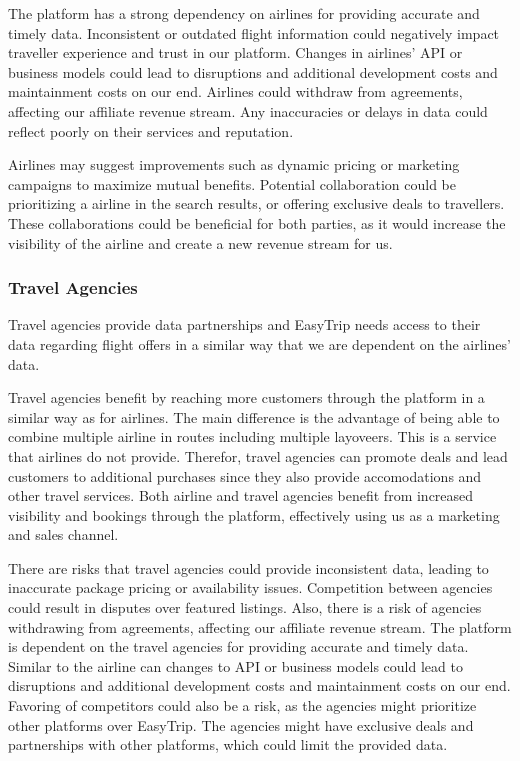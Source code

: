    
The platform has a strong dependency on airlines for providing accurate and timely data. Inconsistent or outdated flight information could negatively impact traveller experience and trust in our platform. Changes in airlines' API or business models could lead to disruptions and additional development costs and maintainment costs on our end. Airlines could withdraw from agreements, affecting our affiliate revenue stream. Any inaccuracies or delays in data could reflect poorly on their services and reputation.


Airlines may suggest improvements such as dynamic pricing or marketing campaigns to maximize mutual benefits. Potential collaboration could be prioritizing a airline in the search results, or offering exclusive deals to travellers. These collaborations could be beneficial for both parties, as it would increase the visibility of the airline and create a new revenue stream for us.

\subsubsection{Travel Agencies}
Travel agencies provide data partnerships and EasyTrip needs access to their data regarding flight offers in a similar way that we are dependent on the airlines' data.


Travel agencies benefit by reaching more customers through the platform in a similar way as for airlines. The main difference is the advantage of being able to combine multiple airline in routes including multiple layoveers. This is a service that airlines do not provide. Therefor, travel agencies can promote deals and lead customers to additional purchases since they also provide accomodations and other travel services. Both airline and travel agencies benefit from increased visibility and bookings through the platform, effectively using us as a marketing and sales channel.


There are risks that travel agencies could provide inconsistent data, leading to inaccurate package pricing or availability issues. Competition between agencies could result in disputes over featured listings. Also, there is a risk of agencies withdrawing from agreements, affecting our affiliate revenue stream. The platform is dependent on the travel agencies for providing accurate and timely data. Similar to the airline can changes to API or business models could lead to disruptions and additional development costs and maintainment costs on our end. Favoring of competitors could also be a risk, as the agencies might prioritize other platforms over EasyTrip. The agencies might have exclusive deals and partnerships with other platforms, which could limit the provided data.


